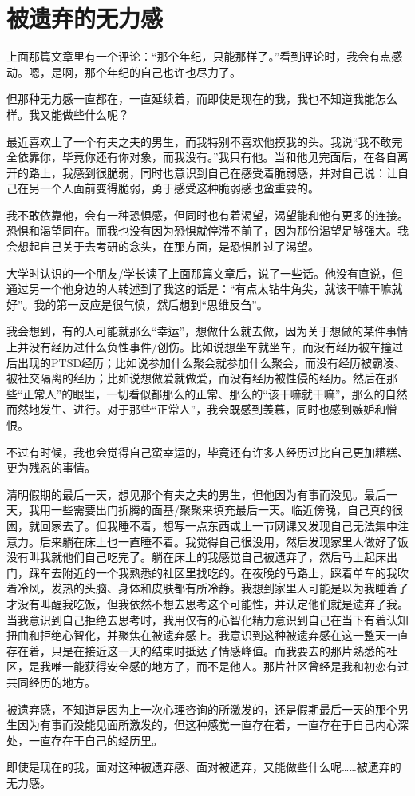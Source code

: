 \chapter{被遗弃的无力感}





上面那篇文章里有一个评论：“那个年纪，只能那样了。”看到评论时，我会有点感动。嗯，是啊，那个年纪的自己也许也尽力了。

但那种无力感一直都在，一直延续着，而即使是现在的我，我也不知道我能怎么样。我又能做些什么呢？

最近喜欢上了一个有夫之夫的男生，而我特别不喜欢他摸我的头。我说“我不敢完全依靠你，毕竟你还有你对象，而我没有。”我只有他。当和他见完面后，在各自离开的路上，我感到很脆弱，同时也意识到自己在感受着脆弱感，并对自己说：让自己在另一个人面前变得脆弱，勇于感受这种脆弱感也蛮重要的。

我不敢依靠他，会有一种恐惧感，但同时也有着渴望，渴望能和他有更多的连接。恐惧和渴望同在。而我也没有因为恐惧就停滞不前了，因为那份渴望足够强大。我会想起自己关于去考研的念头，在那方面，是恐惧胜过了渴望。

大学时认识的一个朋友/学长读了上面那篇文章后，说了一些话。他没有直说，但通过另一个他身边的人转述到了我这的话是：“有点太钻牛角尖，就该干嘛干嘛就好”。我的第一反应是很气愤，然后想到“思维反刍”。

我会想到，有的人可能就那么“幸运”，想做什么就去做，因为关于想做的某件事情上并没有经历过什么负性事件/创伤。比如说想坐车就坐车，而没有经历被车撞过后出现的PTSD经历；比如说参加什么聚会就参加什么聚会，而没有经历被霸凌、被社交隔离的经历；比如说想做爱就做爱，而没有经历被性侵的经历。然后在那些“正常人”的眼里，一切看似都那么的正常、那么的“该干嘛就干嘛”，那么的自然而然地发生、进行。对于那些“正常人”，我会既感到羡慕，同时也感到嫉妒和憎恨。

不过有时候，我也会觉得自己蛮幸运的，毕竟还有许多人经历过比自己更加糟糕、更为残忍的事情。

清明假期的最后一天，想见那个有夫之夫的男生，但他因为有事而没见。最后一天，我用一些需要出门折腾的面基/聚聚来填充最后一天。临近傍晚，自己真的很困，就回家去了。但我睡不着，想写一点东西或上一节网课又发现自己无法集中注意力。后来躺在床上也一直睡不着。我觉得自己很没用，然后发现家里人做好了饭没有叫我就他们自己吃完了。躺在床上的我感觉自己被遗弃了，然后马上起床出门，踩车去附近的一个我熟悉的社区里找吃的。在夜晚的马路上，踩着单车的我吹着冷风，发热的头脑、身体和皮肤都有所冷静。我想到家里人可能是以为我睡着了才没有叫醒我吃饭，但我依然不想去思考这个可能性，并认定他们就是遗弃了我。当我意识到自己拒绝去思考时，我用仅有的心智化精力意识到自己在当下有着认知扭曲和拒绝心智化，并聚焦在被遗弃感上。我意识到这种被遗弃感在这一整天一直存在着，只是在接近这一天的结束时抵达了情感峰值。而我要去的那片熟悉的社区，是我唯一能获得安全感的地方了，而不是他人。那片社区曾经是我和初恋有过共同经历的地方。

被遗弃感，不知道是因为上一次心理咨询的所激发的，还是假期最后一天的那个男生因为有事而没能见面所激发的，但这种感觉一直存在着，一直存在于自己内心深处，一直存在于自己的经历里。

即使是现在的我，面对这种被遗弃感、面对被遗弃，又能做些什么呢……被遗弃的无力感。

